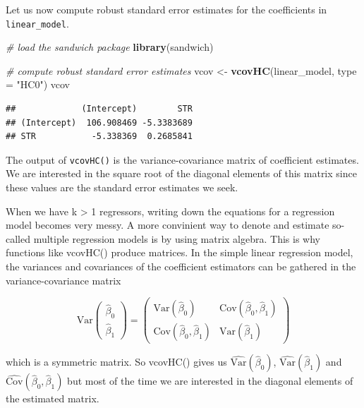 \documentclass[]{book}
\newenvironment{Shaded}{\begin{snugshade}}{\end{snugshade}}
\newcommand{\KeywordTok}[1]{\textcolor[rgb]{0.13,0.29,0.53}{\textbf{#1}}}
\newcommand{\DataTypeTok}[1]{\textcolor[rgb]{0.13,0.29,0.53}{#1}}
\newcommand{\StringTok}[1]{\textcolor[rgb]{0.31,0.60,0.02}{#1}}
\newcommand{\CommentTok}[1]{\textcolor[rgb]{0.56,0.35,0.01}{\textit{#1}}}
\newcommand{\NormalTok}[1]{#1}
\theoremstyle{definition}
\theoremstyle{definition}
\theoremstyle{definition}
\theoremstyle{remark}
\let\BeginKnitrBlock\begin \let\EndKnitrBlock\end
\begin{document}
Let us now compute robust standard error estimates for the coefficients
in \texttt{linear\_model}.

\begin{Shaded}
\begin{Highlighting}[]
\CommentTok{# load the sandwich package}
\KeywordTok{library}\NormalTok{(sandwich)}

\CommentTok{# compute robust standard error estimates}
\NormalTok{vcov <-}\StringTok{ }\KeywordTok{vcovHC}\NormalTok{(linear_model, }\DataTypeTok{type =} \StringTok{"HC0"}\NormalTok{)}
\NormalTok{vcov}
\end{Highlighting}
\end{Shaded}

\begin{verbatim}
##             (Intercept)        STR
## (Intercept)  106.908469 -5.3383689
## STR           -5.338369  0.2685841
\end{verbatim}

The output of \texttt{vcovHC()} is the variance-covariance matrix of
coefficient estimates. We are interested in the square root of the
diagonal elements of this matrix since these values are the standard
error estimates we seek.

\BeginKnitrBlock{rmdknit}
When we have k \textgreater{} 1 regressors, writing down the equations
for a regression model becomes very messy. A more convinient way to
denote and estimate so-called multiple regression models is by using
matrix algebra. This is why functions like vcovHC() produce matrices. In
the simple linear regression model, the variances and covariances of the
coefficient estimators can be gathered in the variance-covariance matrix

\begin{equation}
\text{Var}
  \begin{pmatrix}
    \hat\beta_0 \\
    \hat\beta_1
  \end{pmatrix} = 
\begin{pmatrix}
  \text{Var}(\hat\beta_0) & \text{Cov}(\hat\beta_0,\hat\beta_1) \\
\text{Cov}(\hat\beta_0,\hat\beta_1) & \text{Var}(\hat\beta_1)
\end{pmatrix}
\end{equation}

which is a symmetric matrix. So vcovHC() gives us
\(\widehat{\text{Var}}(\hat\beta_0)\),
\(\widehat{\text{Var}}(\hat\beta_1)\) and
\(\widehat{\text{Cov}}(\hat\beta_0,\hat\beta_1)\) but most of the time
we are interested in the diagonal elements of the estimated matrix.
\EndKnitrBlock{rmdknit}
\end{document}
